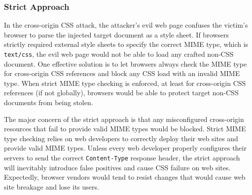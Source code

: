 \documentclass{acm_proc_article-sp}
\begin{document}
\subsubsection{Strict Approach}
In the cross-origin CSS attack, the attacker's evil web page confuses the victim's browser to parse the injected target document as a style sheet. If browsers strictly required external style sheets to specify the correct MIME type, which is \texttt{text/css}, the evil web page would not be able to load any crafted non-CSS document. One effective solution is to let browsers always check the MIME type for cross-origin CSS references and block any CSS load with an invalid MIME type. When strict MIME type checking is enforced, at least for cross-origin CSS references (if not globally), browsers would be able to protect target non-CSS documents from being stolen.

The major concern of the strict approach is that any misconfigured cross-origin resources that fail to provide valid MIME types would be blocked. Strict MIME type checking relies on web developers to correctly deploy their web sites and provide valid MIME types. Unless every web developer properly configures their servers to send the correct \texttt{Content-Type} response header, the strict approach will inevitably introduce false positives and cause CSS failure on web sites. Expectedly, browser vendors would tend to resist changes that would cause web site breakage and lose its users.
\end{document}
